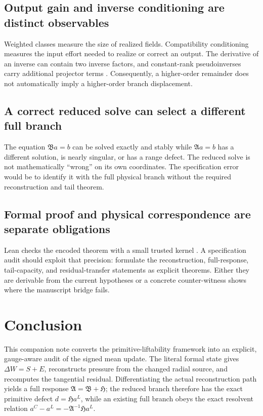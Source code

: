 \documentclass[12pt]{article}
\theoremstyle{plain}
\theoremstyle{definition}
\theoremstyle{remark}
\newcommand{\Comp}{\mathfrak A}
\newcommand{\Red}{\mathfrak B}
\newcommand{\Hidden}{\mathfrak H}
\begin{document}
\subsection{Output gain and inverse conditioning are distinct observables}
Weighted classes measure the size of realized fields. Compatibility conditioning measures the input effort needed to realize or correct an output. The derivative of an inverse can contain two inverse factors, and constant-rank pseudoinverses carry additional projector terms \cite{GolubPereyra1973}. Consequently, a higher-order remainder does not automatically imply a higher-order branch displacement.

\subsection{A correct reduced solve can select a different full branch}
The equation \(\Red a=b\) can be solved exactly and stably while \(\Comp a=b\) has a different solution, is nearly singular, or has a range defect. The reduced solve is not mathematically ``wrong'' on its own coordinates. The specification error would be to identify it with the full physical branch without the required reconstruction and tail theorem.

\subsection{Formal proof and physical correspondence are separate obligations}
Lean checks the encoded theorem with a small trusted kernel \cite{deMouraEtAl2015,Lean4Reference}. A specification audit should exploit that precision: formulate the reconstruction, full-response, tail-capacity, and residual-transfer statements as explicit theorems. Either they are derivable from the current hypotheses or a concrete counter-witness shows where the manuscript bridge fails.

\section{Conclusion}\label{sec:conclusion}
This companion note converts the primitive-liftability framework into an explicit, gauge-aware audit of the signed mean update. The literal formal state gives \(\Delta W=S+E\), reconstructs pressure from the changed radial source, and recomputes the tangential residual. Differentiating the actual reconstruction path yields a full response \(\Comp=\Red+\Hidden\); the reduced branch therefore has the exact primitive defect \(d=\Hidden a^L\), while an existing full branch obeys the exact resolvent relation \(a^C-a^L=-\Comp^{-1}\Hidden a^L\).
\end{document}
